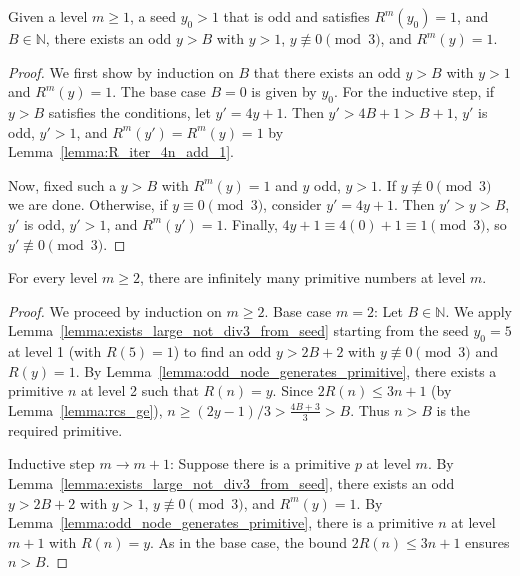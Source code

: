 \begin{lemma}\label{lemma:exists_large_not_div3_from_seed}\leanok
Given a level $m \ge 1$, a seed $y_0 > 1$ that is odd and satisfies $R^m(y_0) = 1$, and $B \in \mathbb{N}$, there exists an odd $y > B$ with $y > 1$, $y \not\equiv 0 \pmod{3}$, and $R^m(y) = 1$.
\end{lemma}
\begin{proof}\leanok
We first show by induction on $B$ that there exists an odd $y > B$ with $y > 1$ and $R^m(y) = 1$.
The base case $B=0$ is given by $y_0$.
For the inductive step, if $y > B$ satisfies the conditions, let $y' = 4y + 1$. Then $y' > 4B + 1 > B+1$, $y'$ is odd, $y' > 1$, and $R^m(y') = R^m(y) = 1$ by Lemma~\ref{lemma:R_iter_4n_add_1}.

Now, fixed such a $y > B$ with $R^m(y) = 1$ and $y$ odd, $y > 1$. If $y \not\equiv 0 \pmod{3}$ we are done.
Otherwise, if $y \equiv 0 \pmod{3}$, consider $y' = 4y + 1$.
Then $y' > y > B$, $y'$ is odd, $y' > 1$, and $R^m(y') = 1$.
Finally, $4y + 1 \equiv 4(0) + 1 \equiv 1 \pmod{3}$, so $y' \not\equiv 0 \pmod{3}$.
\end{proof}

\begin{lemma}\label{lemma:infinite_primitives}\leanok
For every level $m \ge 2$, there are infinitely many primitive numbers at level $m$.
\end{lemma}
\begin{proof}\leanok
We proceed by induction on $m \ge 2$.
Base case $m=2$: Let $B \in \mathbb{N}$. We apply Lemma~\ref{lemma:exists_large_not_div3_from_seed} starting from the seed $y_0 = 5$ at level 1 (with $R(5)=1$) to find an odd $y > 2B + 2$ with $y \not\equiv 0 \pmod{3}$ and $R(y) = 1$. By Lemma~\ref{lemma:odd_node_generates_primitive}, there exists a primitive $n$ at level 2 such that $R(n) = y$. Since $2R(n) \le 3n + 1$ (by Lemma~\ref{lemma:rcs_ge}), $n \ge (2y - 1)/3 > \frac{4B+3}{3} > B$. Thus $n > B$ is the required primitive.

Inductive step $m \to m+1$: Suppose there is a primitive $p$ at level $m$. By Lemma~\ref{lemma:exists_large_not_div3_from_seed}, there exists an odd $y > 2B + 2$ with $y > 1$, $y \not\equiv 0 \pmod{3}$, and $R^m(y) = 1$. By Lemma~\ref{lemma:odd_node_generates_primitive}, there is a primitive $n$ at level $m+1$ with $R(n) = y$. As in the base case, the bound $2R(n) \le 3n + 1$ ensures $n > B$.
\end{proof}
